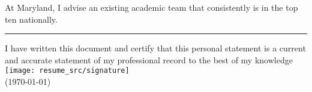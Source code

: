 \documentclass[11pt]{amsart}
\begin{document}
At Maryland, I advise an existing academic team that
consistently is in the top ten nationally.

\noindent\rule{4cm}{0.4pt}


    \parbox{\linewidth}{I have written this document and certify that this
  personal statement is a current and accurate statement of my
  professional record to the best of my
  knowledge \flushright  \texttt{[image: resume\_src/signature]} \\
  \flushright  (\today{})}

\clearpage

\begin{multicols}{2}
  \footnotesize



\end{multicols}
\end{document}
